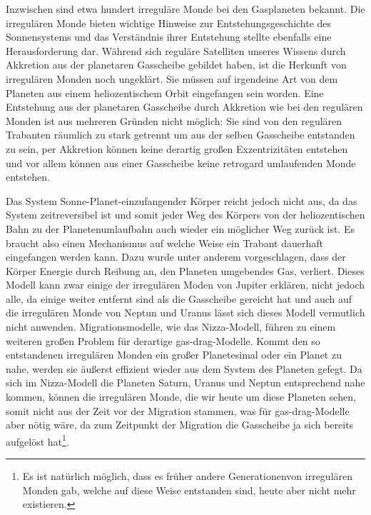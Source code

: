 \documentclass[12pt,a4paper,twoside]{article}
\begin{document}
Inzwischen sind etwa hundert irreguläre Monde bei den Gasplaneten bekannt. %
Die irregulären Monde bieten wichtige Hinweise zur Entstehungsgeschichte des Sonnensystems und das Verständnis ihrer Entstehung stellte ebenfalls eine Herausforderung dar.
Während sich reguläre Satelliten unseres Wissens durch Akkretion aus der planetaren Gasscheibe gebildet haben, ist die Herkunft von irregulären Monden noch ungeklärt.
Sie müssen auf irgendeine Art von dem Planeten aus einem heliozentischem Orbit eingefangen sein worden. Eine Entstehung aus der planetaren Gasscheibe durch Akkretion wie bei den regulären Monden ist aus mehreren Gründen nicht möglich:
Sie sind von den regulären Trabanten räumlich zu stark getrennt um aus der selben Gasscheibe entstanden zu sein, per Akkretion können keine derartig großen Exzentrizitäten entstehen und vor allem können aus einer Gasscheibe keine retrogard umlaufenden Monde entstehen\cite{Nesvorny2007}. %

Das System Sonne-Planet-einzufangender Körper reicht jedoch nicht aus, da das System zeitreversibel ist und somit jeder Weg des Körpers von der heliozentischen Bahn zu der Planetenumlaufbahn auch wieder ein möglicher Weg zurück ist\cite{Nesvorny2007}. %
Es braucht also einen Mechanismus auf welche Weise ein Trabant dauerhaft eingefangen werden kann. Dazu wurde unter anderem vorgeschlagen, dass der Körper Energie durch Reibung an, den Planeten umgebendes Gas, verliert. %
Dieses Modell kann zwar einige der irregulären Moden von Jupiter erklären, nicht jedoch alle, da einige weiter entfernt sind als die Gasscheibe gereicht hat und auch auf die irregulären Monde von Neptun und Uranus lässt sich dieses Modell vermutlich nicht anwenden\cite{Nesvorny2007}. %
Migrationsmodelle, wie das Nizza-Modell, führen zu einem weiteren großen Problem für derartige \glqq gas-drag\grqq-Modelle. Kommt den so entstandenen irregulären Monden ein großer Planetesimal oder ein Planet zu nahe, werden sie äußerst effizient wieder aus dem System des Planeten gefegt\cite{Nesvorny2007}. Da sich im Nizza-Modell die Planeten Saturn, Uranus und Neptun entsprechend nahe kommen, können die irregulären Monde, die wir heute um diese Planeten sehen, somit nicht aus der Zeit vor der Migration stammen\cite{Tsiganis2005,Nesvorny2007}, was für \glqq gas-drag\grqq-Modelle aber nötig wäre, da zum Zeitpunkt der Migration die Gasscheibe ja sich bereits aufgelöst hat\footnote{Es ist natürlich möglich, dass es früher andere \glqq Generationen\grqq von irregulären Monden gab, welche auf diese Weise entstanden sind, heute aber nicht mehr existieren. }. %
\end{document}
